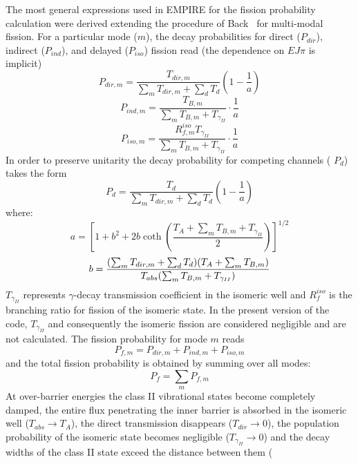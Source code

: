 The most general expressions used in EMPIRE for the fission probability
calculation were derived extending the procedure of Back~\cite{Back:74} for
multi-modal fission. For a particular mode ($m$), the decay probabilities
for direct ($P_{dir}$), indirect ($P_{ind}$), and delayed ($P_{iso}$)
fission read (the dependence on $EJ\pi$ is implicit)
\begin{equation}
P_{dir,m}=\frac{T_{dir,m}}{\sum_{m}T_{dir,m}+\sum_{d}T_{d}}\left(1-\frac{1}{a%
}\right)
\end{equation}
\begin{equation}
P_{ind,m}=\frac{T_{B,m}}{\sum_{m}T_{B,m}+T_{\gamma_{II}}}\cdot\frac{1}{a}
\end{equation}
\begin{equation}
P_{iso,m}=\frac{R_{f,m}^{iso}T_{\gamma_{II}}}{\sum_{m}T_{B,m}+T_{\gamma_{II}}%
}\cdot\frac{1}{a}
\end{equation}
In order to preserve unitarity the decay probability for competing channels (%
$P_{d}$) takes the form
\begin{equation}
P_{d}=\frac{T_{d}}{\sum_{m}T_{dir,m}+\sum_{d}T_{d}}\left(1-\frac{1}{a}\right)
\end{equation}
\noindent where:
\[
a=\left[1+b^{2}+2b\coth\left(\frac{T_{A}+\sum_{m}T_{B,m}+T_{\gamma_{II}}}{2}%
\right)\right]^{1/2}
\]
\[
b=\frac{(\sum_{m}T_{dir,m}+\sum_{d}T_{d})(T_{A}+\sum_{m}T_{B,m})}{%
T_{abs}(\sum_{m}T_{B,m}+T_{\gamma_{II}})}
\]
$T_{\gamma_{II}}$ represents $\gamma$-decay transmission coefficient in the
isomeric well and $R_{f}^{iso}$ is the branching ratio for fission of the
isomeric state. In the present version of the code, $T_{\gamma_{II}}$ and
consequently the isomeric%
 fission are considered negligible and are not
calculated. The fission probability for mode $m$ reads
\begin{equation}
P_{f,m}=P_{dir,m}+P_{ind,m}+P_{iso,m}
\end{equation}
and the total fission probability is obtained by summing over all modes:
\begin{equation}
P_{f}=\sum_{m}P_{f,m}
\end{equation}
At over-barrier energies the class II vibrational states become completely
damped, the entire flux penetrating the inner barrier is absorbed in the
isomeric well ($T_{abs}\rightarrow T_{A}$), the direct transmission
disappears ($T_{dir}\rightarrow0$), the population probability of the
isomeric%
 state becomes negligible ($T_{\gamma_{II}}\rightarrow0$)
and the decay widths of the class II state exceed the distance between them (%
